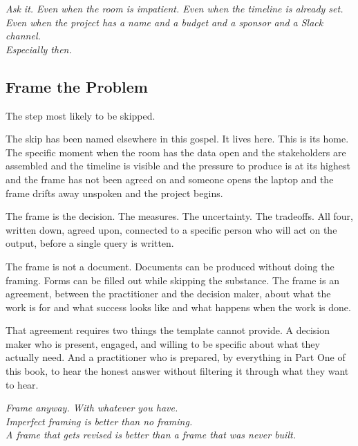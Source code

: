 \begin{center}\small\itshape
  Ask it. Even when the room is impatient. Even when the timeline is already set.\\
  Even when the project has a name and a budget and a sponsor and a Slack channel.\\
  Especially then.
\end{center}

\subsection*{Frame the Problem}

The step most likely to be skipped.

The skip has been named elsewhere in this gospel. It lives here. This is its home. The specific moment when the room has the data open and the stakeholders are assembled and the timeline is visible and the pressure to produce is at its highest and the frame has not been agreed on and someone opens the laptop and the frame drifts away unspoken and the project begins.

The frame is the decision. The measures. The uncertainty. The tradeoffs. All four, written down, agreed upon, connected to a specific person who will act on the output, before a single query is written.

The frame is not a document. Documents can be produced without doing the framing. Forms can be filled out while skipping the substance. The frame is an agreement, between the practitioner and the decision maker, about what the work is for and what success looks like and what happens when the work is done.

That agreement requires two things the template cannot provide. A decision maker who is present, engaged, and willing to be specific about what they actually need. And a practitioner who is prepared, by everything in Part One of this book, to hear the honest answer without filtering it through what they want to hear.

\begin{center}\small\itshape
  Frame anyway. With whatever you have.\\
  Imperfect framing is better than no framing.\\
  A frame that gets revised is better than a frame that was never built.
\end{center}


